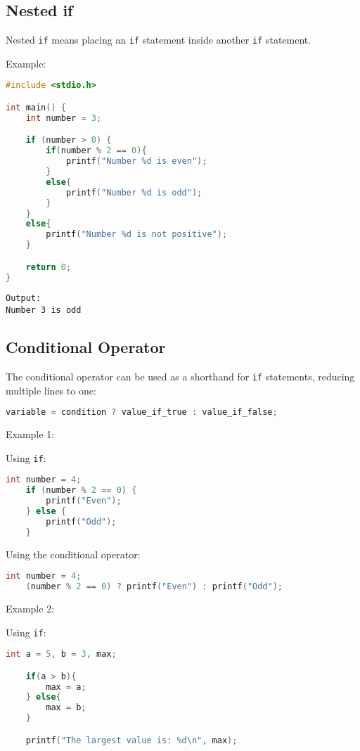 \subsection{Nested if}

Nested \verb|if| means placing an \verb|if| statement inside another \verb|if| statement.

Example:
\begin{lstlisting}[language=c]
#include <stdio.h>

int main() {
	int number = 3;

	if (number > 0) {
		if(number % 2 == 0){
			printf("Number %d is even");
		}
		else{
			printf("Number %d is odd");
		}
	}
	else{
		printf("Number %d is not positive");
	}

	return 0;
}
\end{lstlisting}
\begin{verbatim}
Output:
Number 3 is odd
\end{verbatim}

\subsection{Conditional Operator}

The conditional operator can be used as a shorthand for \verb|if| statements, reducing multiple lines to one:

{
\captionsetup[lstlisting]{labelformat=empty, justification=raggedright, singlelinecheck=false}
\begin{lstlisting}[language=c, caption={Syntax}]
    variable = condition ? value_if_true : value_if_false;
\end{lstlisting}
}

Example 1:

Using \verb|if|:
\begin{lstlisting}[language=c]
	int number = 4;
	if (number % 2 == 0) {
		printf("Even");
	} else {
		printf("Odd");
	}
\end{lstlisting}

Using the conditional operator:
\begin{lstlisting}[language=c]
	int number = 4;
	(number % 2 == 0) ? printf("Even") : printf("Odd");
\end{lstlisting}

Example 2:

Using \verb|if|:
\begin{lstlisting}[language=c]
	int a = 5, b = 3, max;

	if(a > b){
		max = a;
	} else{
		max = b;
	}

	printf("The largest value is: %d\n", max);
\end{lstlisting}

